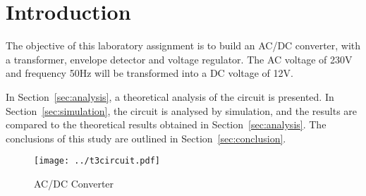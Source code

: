 \section{Introduction}
\label{sec:introduction}

The objective of this laboratory assignment is to build an AC/DC converter, with a transformer, envelope  detector and voltage regulator. The AC voltage of 230V and frequency 50Hz will be transformed into a DC voltage of 12V.

In Section~\ref{sec:analysis}, a theoretical analysis of the circuit is
presented. In Section~\ref{sec:simulation}, the circuit is analysed by
simulation, and the results are compared to the theoretical results obtained in
Section~\ref{sec:analysis}. The conclusions of this study are outlined in
Section~\ref{sec:conclusion}.

\begin{figure}[H] \centering
\texttt{[image: ../t3circuit.pdf]}
\caption{AC/DC Converter}
\label{fig:t3}
\end{figure}

